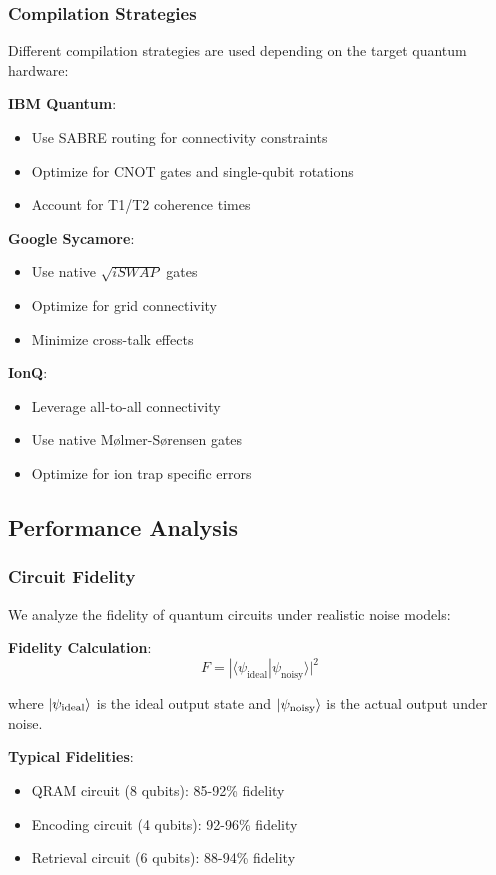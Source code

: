 \subsubsection{Compilation Strategies}

Different compilation strategies are used depending on the target quantum hardware:

\textbf{IBM Quantum}:
\begin{itemize}
    \item Use SABRE routing for connectivity constraints
    \item Optimize for CNOT gates and single-qubit rotations
    \item Account for T1/T2 coherence times
\end{itemize}

\textbf{Google Sycamore}:
\begin{itemize}
    \item Use native $\sqrt{iSWAP}$ gates
    \item Optimize for grid connectivity
    \item Minimize cross-talk effects
\end{itemize}

\textbf{IonQ}:
\begin{itemize}
    \item Leverage all-to-all connectivity
    \item Use native Mølmer-Sørensen gates
    \item Optimize for ion trap specific errors
\end{itemize}

\subsection{Performance Analysis}

\subsubsection{Circuit Fidelity}

We analyze the fidelity of quantum circuits under realistic noise models:

\textbf{Fidelity Calculation}:
$$F = |\langle\psi_{\text{ideal}}|\psi_{\text{noisy}}\rangle|^2$$

where $\left|\psi_{\text{ideal}}\right\rangle$ is the ideal output state and $\left|\psi_{\text{noisy}}\right\rangle$ is the actual output under noise.

\textbf{Typical Fidelities}:
\begin{itemize}
    \item QRAM circuit (8 qubits): 85-92\% fidelity
    \item Encoding circuit (4 qubits): 92-96\% fidelity
    \item Retrieval circuit (6 qubits): 88-94\% fidelity
\end{itemize}


